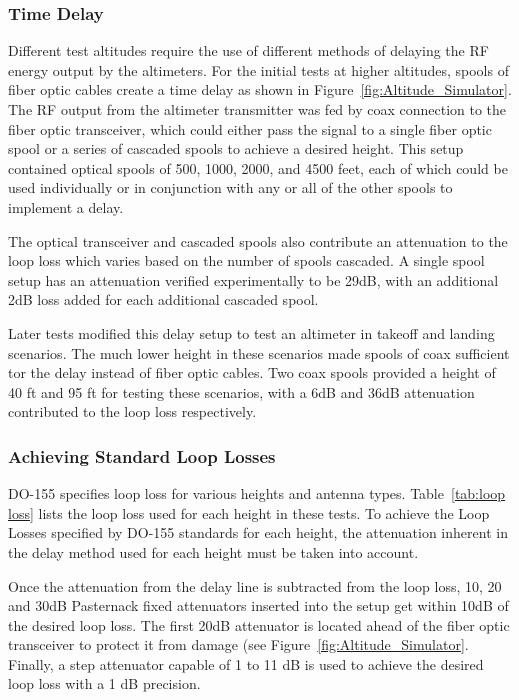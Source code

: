 \subsubsection{Time Delay}\label{subsub:delay}
Different test altitudes require the use of different methods of delaying the RF energy output by the altimeters. For the initial tests at higher altitudes, spools of fiber optic cables create a time delay as shown in Figure~\ref{fig:Altitude_Simulator}. The RF output from the altimeter transmitter was fed by coax connection to the fiber optic transceiver, which could either pass the signal to a single fiber optic spool or a series of cascaded spools to achieve a desired height. This setup contained optical spools of 500, 1000, 2000, and 4500 feet, each of which could be used individually or in conjunction with any or all of the other spools to implement a delay.

 The optical transceiver and cascaded spools also contribute an attenuation to the loop loss which varies based on the number of spools cascaded. A single spool setup has an attenuation verified experimentally to be 29dB, with an additional 2dB loss added for each additional cascaded spool.

Later tests modified this delay setup to test an altimeter in takeoff and landing scenarios. The much lower height in these scenarios made spools of coax sufficient tor the delay instead of fiber optic cables. Two coax spools provided a height of 40 ft and 95 ft for testing these scenarios, with a 6dB and 36dB attenuation contributed to the loop loss respectively.  

\subsubsection{Achieving Standard Loop Losses}\label{subsub:loss}
DO-155 specifies loop loss for various heights and antenna types. Table~\ref{tab:loop loss} lists the loop loss used for each height in these tests. To achieve the Loop Losses specified by DO-155 standards for each height, the attenuation inherent in the delay method used for each height must be taken into account. 

Once the attenuation from the delay line is subtracted from the loop loss, 10, 20 and 30dB Pasternack fixed attenuators inserted into the setup get within 10dB of the desired loop loss. The first 20dB attenuator is located ahead of the fiber optic transceiver to protect it from damage (see Figure~\ref{fig:Altitude_Simulator}.  Finally, a step attenuator capable of 1 to 11 dB is used to achieve the desired loop loss with a 1 dB precision. 

